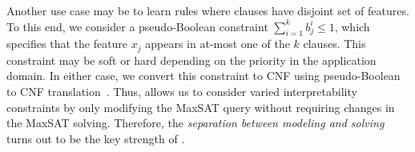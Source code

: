 Another use case may be to learn rules where clauses have disjoint set of features. To this end, we consider a pseudo-Boolean constraint $ \sum_{i=1}^k b^i_j \le 1 $, which specifies that the feature $ x_j $ appears in at-most one of the $ k $ clauses. This constraint may be soft or hard depending on the priority in the application domain. In either case, we convert this constraint to CNF using pseudo-Boolean to CNF translation~\cite{philipp2015pblib}. Thus, {\imli} allows us to consider varied interpretability constraints by only modifying the MaxSAT query without requiring changes in the MaxSAT solving. Therefore, the \emph{separation between modeling and solving} turns out to be the key strength of {\imli}.



